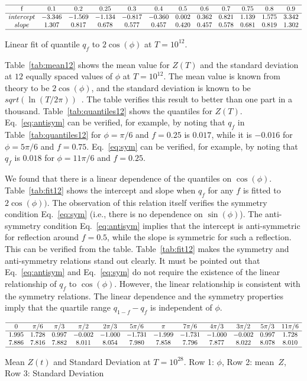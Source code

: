 \documentclass[twoside]{article}
\begin{document}
\begin{table}
\centering \(\begin{array}{cccccccccccc}
\hline
$f$&0.1&0.2&0.25&0.3&0.4&0.5&0.6&0.7&0.75&0.8&0.9\\
\hline
intercept&-3.346&-1.569&-1.134&-0.817&-0.360&0.002&0.362&0.821&1.139&1.575&3.342\\
slope&1.307&0.817&0.678&0.577&0.457&0.420&0.457&0.578&0.681&0.819&1.302\\
\hline
\end{array}\)
\caption{Linear fit of quantile $q_f$ to $2\cos(\phi)$ at $T=10^{12}$.}
\label{tab:fit12}
\end{table}

Table~\ref{tab:mean12} shows the mean value for $Z(T)$ and the standard deviation at $12$ equally spaced values 
of $\phi$ at $T=10^{12}$. 
The mean value is known from theory to be $2\cos(\phi)$, and the standard deviation is known 
to be $sqrt(\ln(T/2\pi))$~\cite{Shanker 2018b}. The table verifies this result to better 
than one part in a thousand. Table~\ref{tab:quantiles12} shows the quantiles for $Z(T)$. 
Eq.~\ref{eq:antisym} can be verified, for example, by noting that $q_f$ in Table~\ref{tab:quantiles12}
for $\phi=\pi/6$ and $f=0.25$ is $0.017$, while it is $-0.016$ for $\phi=5\pi/6$ and $f=0.75$. 
Eq.~\ref{eq:sym} can be verified, for example, by noting that $q_f$ is $0.018$ for $\phi=11\pi/6$ and $f=0.25$.

We found that there is a linear dependence of the quantiles on $\cos(\phi)$. 
Table~\ref{tab:fit12} shows the intercept and slope when $q_f$ for any $f$ is fitted to
$2\cos(\phi))$. The observation of this relation itself verifies the symmetry condition 
Eq.~\ref{eq:sym} (i.e., there is no dependence on $\sin(\phi)$). 
The anti-symmetry condition Eq.~\ref{eq:antisym} implies that the intercept is anti-symmetric 
for reflection around $f=0.5$, while the slope is symmetric for such a reflection. This can be verified from the table. Table~\ref{tab:fit12} makes the symmetry and anti-symmetry relations stand out clearly.  It must be pointed out that Eq.~\ref{eq:antisym} and Eq.~\ref{eq:sym} do not require the
existence of the linear relationship of $q_f$ to $\cos(\phi)$. However, the linear relationship is consistent with the symmetry relations.
The linear dependence and the symmetry properties imply that the quartile range $q_{1-f}-q_f$ is independent of $\phi$.

\begin{table}
\centering \(\begin{array}{cccccccccccc}

\hline
0&\pi/6 &\pi/3 &\pi/2 &2\pi/3 &5\pi/6 &\pi &7\pi/6 &4\pi/3 &3\pi/2 &5\pi/3 &11\pi/6 \\
\hline
1.995&1.728&0.997&-0.002&-1.000&-1.731&-1.999&-1.731&-1.000&-0.002&0.997&1.728 \\
7.886&7.816&7.882&8.011&8.054&7.980&7.858&7.796&7.877&8.022&8.078&8.010 \\
\hline
\end{array}\)
\caption{Mean    $Z(t)$ and Standard Deviation at $T=10^{28}$. Row 1: $\phi$, Row 2: mean~$Z$, Row 3: Standard Deviation}
\label{tab:mean28}
\end{table}
\end{document}
